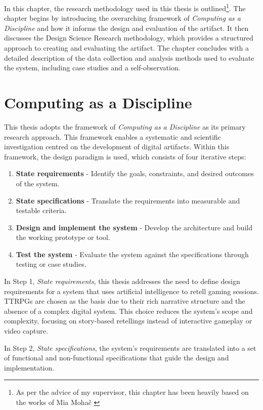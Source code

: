 \label{sec:Methods}
In this chapter, the research methodology used in this thesis is outlined\footnote{As per the advice of my supervisor, this chapter has been heavily based on the works of Mia Mohač \cite{ExploringVRUI}}. The chapter begins by introducing the overarching framework of \textit{Computing as a Discipline} and how it informs the design and evaluation of the artifact. It then discusses the Design Science Research methodology, which provides a structured approach to creating and evaluating the artifact. The chapter concludes with a detailed description of the data collection and analysis methods used to evaluate the system, including case studies and a self-observation.

\section{Computing as a Discipline}
This thesis adopts the framework of \textit{Computing as a Discipline} \cite{denning1989computing} as its primary research approach. This framework enables a systematic and scientific investigation centred on the development of digital artifacts. Within this framework, the design paradigm is used, which consists of four iterative steps:

\begin{enumerate}
\item \textbf{State requirements} - Identify the goals, constraints, and desired outcomes of the system.
\item \textbf{State specifications} - Translate the requirements into measurable and testable criteria.
\item \textbf{Design and implement the system} - Develop the architecture and build the working prototype or tool.
\item \textbf{Test the system} - Evaluate the system against the specifications through testing or case studies.
\end{enumerate}

In Step 1, \textit{State requirements}, this thesis addresses the need to define design requirements for a system that uses artificial intelligence to retell gaming sessions. TTRPGs are chosen as the basis due to their rich narrative structure and the absence of a complex digital system. This choice reduces the system's scope and complexity, focusing on story-based retellings instead of interactive gameplay or video capture.

In Step 2, \textit{State specifications}, the system’s requirements are translated into a set of functional and non-functional specifications that guide the design and implementation.


